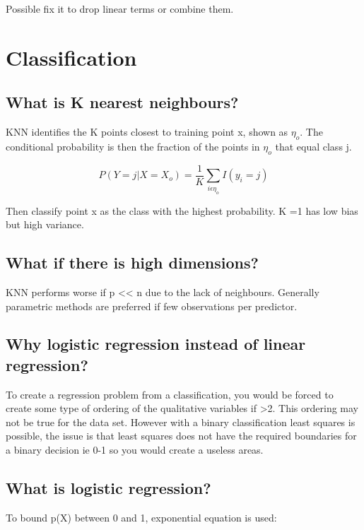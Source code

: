 \documentclass[11pt]{scrartcl} %
\begin{document}
Possible fix it to drop linear terms or combine them.

\section{Classification}

\subsection{What is K nearest neighbours?}

KNN identifies the K points closest to training point x, shown as \(\eta_o\). The conditional probability is then
the fraction of the points in \(\eta_o\) that equal class j.

\begin{equation}
	P(Y=j|X=X_o) = \frac{1}{K}\sum_{i\epsilon \eta_o}{I(y_i=j)}
\end{equation}

Then classify point x as the class with the highest probability. K =1 has low bias but high variance.

\subsection{What if there is high dimensions?}

KNN performs worse if p << n due to the lack of neighbours. Generally parametric methods are preferred if
few observations per predictor.

\subsection{Why logistic regression instead of linear regression?}

To create a regression problem from a classification, you would be forced to create some type of ordering of the qualitative
variables if >2. This ordering may not be true for the data set. However with a binary classification least squares is possible, the
issue is that least squares does not have the required boundaries for a binary decision ie 0-1 so you would create a useless areas.

\subsection{What is logistic regression?}

To bound p(X) between 0 and 1, exponential equation is used:
\end{document}

